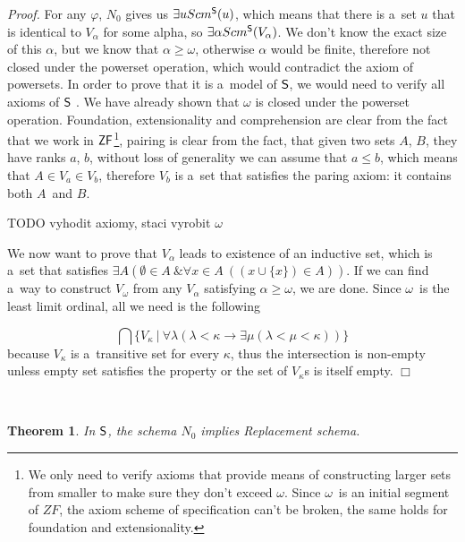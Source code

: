 \documentclass[12pt,a4paper]{article}
\newtheorem{theorem}{Theorem}[section]
\newenvironment{proof}
{\noindent \textit{Proof.}}
{\hspace*{\fill} $\Box$}
\newcommand{\then}{\rightarrow}
\begin{document}
\begin{proof}
For any $\varphi$, $N_0$ gives us $\exists u Scm^{\sf{S}}(u)$, which means that there is a~set $u$ that is identical to $V_\alpha$ for some alpha, so $\exists \alpha Scm^{\sf{S}}(V_\alpha)$.
We don't know the exact size of this $\alpha$, but we know that $\alpha \geq \omega$, otherwise $\alpha$ would be finite, therefore not closed under the powerset operation, which would contradict the axiom of powersets. 
In order to prove that it is a~model of $\sf{S}$, we would need to verify all axioms of $\sf{S}$ . We have already shown that $\omega$ is closed under the powerset operation. Foundation, extensionality and comprehension are clear from the fact that we work in $\sf{ZF}$\footnote{We only need to verify axioms that provide means of constructing larger sets from smaller to make sure they don't exceed $\omega$. Since $\omega$ is an initial segment of $ZF$, the axiom scheme of specification can't be broken, the same holds for foundation and extensionality.}, pairing is clear from the fact, that given two sets $A$, $B$, they have ranks $a$, $b$, without loss of generality we can assume that $a \leq b$, which means that $A \in V_a \in V_b$, therefore $V_b$ is a~set that satisfies the paring axiom: it contains both $A$ and $B$.

TODO vyhodit axiomy, staci vyrobit $\omega$

We now want to prove that $V_\alpha$ leads to existence of an inductive set, which is a~set that satisfies $\exists A(\emptyset \in A~\& \forall  x \in A~((x \cup \{ x\}) \in A))$. If we can find a~way to construct $V_\omega$ from any $V_\alpha$ satisfying $\alpha \geq \omega$, we are done. Since $\omega$ is the least limit ordinal, all we need is the following

\begin{equation}
\bigcap \{V_\kappa\ |\  \forall \lambda(\lambda < \kappa \then \exists \mu(\lambda < \mu < \kappa))\}
\end{equation}
because $V_\kappa$ is a~transitive set for every $\kappa$, thus the intersection is non-empty unless empty set satisfies the property or the set of $V_\kappa$s is itself empty.
\end{proof}

\

\begin{theorem}
In $\sf{S}$, the schema $N_0$ implies Replacement schema.
\end{theorem}
\end{document}
